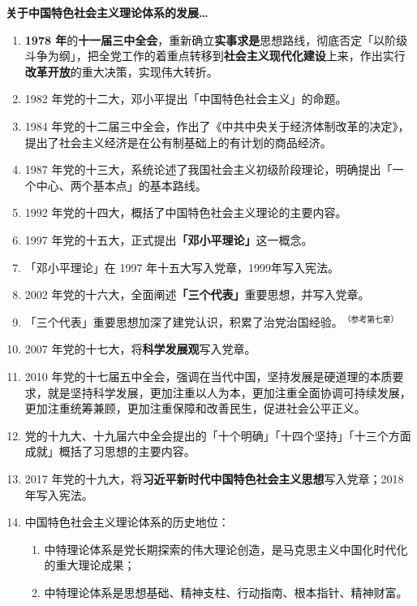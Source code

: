 \documentclass[UTF8]{ctexart}
\newcommand\Emph[2]{\colorbox{c#1-light}{\textcolor{c#1-emph}{\textbf{#2}}}}
\begin{document}
\begin{mybox}{5}
\textbf{关于中国特色社会主义理论体系的发展…}
\begin{enumerate}
  \item \Emph{5}{1978 年}的\Emph{5}{十一届三中全会}，重新确立\Emph{5}{实事求是}思想路线，彻底否定「以阶级斗争为纲」，把全党工作的着重点转移到\Emph{5}{社会主义现代化建设}上来，作出实行\Emph{5}{改革开放}的重大决策，实现伟大转折。
  \item 1982 年党的十二大，邓小平提出「中国特色社会主义」的命题。
  \item 1984 年党的十二届三中全会，作出了《中共中央关于经济体制改革的决定》，提出了社会主义经济是在公有制基础上的有计划的商品经济。
  \item 1987 年党的十三大，系统论述了我国社会主义初级阶段理论，明确提出「一个中心、两个基本点」的基本路线。
  \item 1992 年党的十四大，概括了中国特色社会主义理论的主要内容。
  \item 1997 年党的十五大，正式提出\Emph{5}{「邓小平理论」}这一概念。
  \item 「邓小平理论」在 1997 年十五大写入党章，1999年写入宪法。
  \item 2002 年党的十六大，全面阐述\Emph{5}{「三个代表」}重要思想，并写入党章。
  \item 「三个代表」重要思想加深了建党认识，积累了治党治国经验。\textcolor{dendro!70!black}{$^{\text{（参考第七章）}}$}
  \item 2007 年党的十七大，将\Emph{5}{科学发展观}写入党章。
  \item 2010 年党的十七届五中全会，强调在当代中国，坚持发展是硬道理的本质要求，就是坚持科学发展，更加注重以人为本，更加注重全面协调可持续发展，更加注重统筹兼顾，更加注重保障和改善民生，促进社会公平正义。
  \item 党的十九大、十九届六中全会提出的「十个明确」「十四个坚持」「十三个方面成就」概括了习思想的主要内容。
  \item 2017 年党的十九大，将\Emph{5}{习近平新时代中国特色社会主义思想}写入党章；2018 年写入宪法。
  \item 中国特色社会主义理论体系的历史地位：
  \begin{enumerate}[label={\roman{enumii})}]
    \item 中特理论体系是党长期探索的伟大理论创造，是马克思主义中国化时代化的重大理论成果；
    \item 中特理论体系是思想基础、精神支柱、行动指南、根本指针、精神财富。
  \end{enumerate}
\end{enumerate}
\end{mybox}
\end{document}
